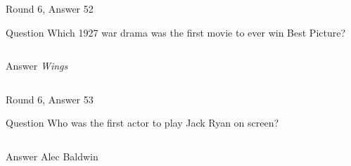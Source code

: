 \documentclass[11pt]{beamer}
\begin{document}
\begin{frame}[t]{Round 6, Answer 52}
  \vspace{2em}
  \begin{block}{Question}
    Which 1927 war drama was the first movie to ever win Best Picture?
  \end{block}
  \pause{}
  \begin{columns}[T,totalwidth=\linewidth]
    \begin{column}{0.35\linewidth}
      \begin{block}{Answer}
        \emph{Wings}
      \end{block}
    \end{column}
    \begin{column}{0.6\linewidth}
      \begin{center}
        \texttt{[image: \{Images/Wings\_poster]}.jpg}
      \end{center}
    \end{column}
  \end{columns}
\end{frame}


\begin{frame}[t]{Round 6, Answer 53}
  \vspace{2em}
  \begin{block}{Question}
    Who was the first actor to play Jack Ryan on screen?
  \end{block}
  \pause{}
  \begin{columns}[T,totalwidth=\linewidth]
    \begin{column}{0.35\linewidth}
      \begin{block}{Answer}
        Alec Baldwin
      \end{block}
    \end{column}
    \begin{column}{0.6\linewidth}
      \begin{center}
        \texttt{[image: \{Images/baldwinryan]}.jpg}
      \end{center}
    \end{column}
  \end{columns}
\end{frame}
\end{document}
